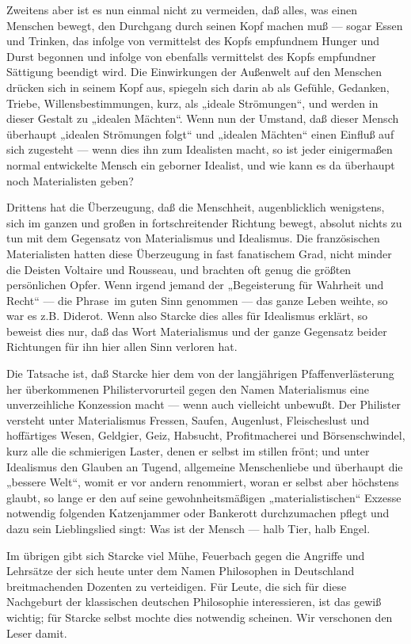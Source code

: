 Zweitens aber ist es nun einmal nicht zu vermeiden, daß alles,
was einen Menschen bewegt, den Durchgang durch seinen Kopf machen muß ---
sogar Essen und Trinken, das infolge von vermittelst des Kopfs
empfundnem  Hunger und Durst begonnen und infolge von ebenfalls
vermittelst des Kopfs empfundner Sättigung beendigt wird. Die
Einwirkungen der Außenwelt auf den Menschen drücken sich in seinem Kopf
aus, spiegeln sich darin ab als Gefühle, Gedanken, Triebe,
Willensbestimmungen, kurz, als „ideale Strömungen``, und werden in dieser
Gestalt zu „idealen Mächten``. Wenn nun der Umstand, daß dieser Mensch
überhaupt „idealen Strömungen folgt`` und „idealen Mächten`` einen
Einfluß auf sich zugesteht --- wenn dies ihn zum Idealisten macht, so ist
jeder einigermaßen normal entwickelte Mensch ein geborner Idealist, und
wie kann es da überhaupt noch Materialisten geben?

Drittens hat die Überzeugung, daß die Menschheit, augenblicklich
wenigstens, sich im ganzen und großen in fortschreitender Richtung
bewegt, absolut nichts zu tun mit dem Gegensatz von Materialismus und
Idealismus. Die französischen Materialisten hatten diese Überzeugung in
fast fanatischem Grad, nicht minder die Deisten Voltaire und Rousseau,
und brachten oft genug die größten persönlichen Opfer. Wenn irgend
jemand der „Begeisterung für Wahrheit und Recht`` --- die Phrase\est\ im guten
Sinn genommen --- das ganze Leben weihte, so war es z.B. Diderot. Wenn
also Starcke dies alles für Idealismus erklärt, so beweist dies nur, daß
das Wort Materialismus und der ganze Gegensatz beider Richtungen für ihn
hier allen Sinn verloren hat.

Die Tatsache ist, daß Starcke hier dem von der langjährigen
Pfaffenverlästerung her überkommenen Philistervorurteil gegen den Namen
Materialismus eine unverzeihliche Konzession macht --- wenn auch
vielleicht unbewußt. Der Philister versteht unter Materialismus Fressen,
Saufen, Augenlust, Fleischeslust und hoffärtiges Wesen, Geldgier, Geiz,
Habsucht, Profitmacherei und Börsenschwindel, kurz alle die schmierigen
Laster, denen er selbst im stillen frönt; und unter Idealismus den
Glauben an Tugend, allgemeine Menschenliebe und überhaupt die „bessere
Welt``, womit er vor andern renommiert, woran er selbst aber höchstens
glaubt, so lange er den auf seine gewohnheitsmäßigen „materialistischen``
Exzesse notwendig folgenden Katzenjammer oder Bankerott durchzumachen
pflegt und dazu sein Lieblingslied singt: Was ist der Mensch --- halb
Tier, halb Engel.

Im übrigen gibt sich Starcke viel Mühe, Feuerbach gegen die
Angriffe und Lehrsätze der sich heute unter dem Namen Philosophen in
Deutschland breitmachenden Dozenten zu verteidigen. Für Leute, die sich
für diese Nachgeburt der klassischen deutschen Philosophie
interessieren, ist das gewiß wichtig; für Starcke selbst mochte dies
notwendig scheinen. Wir verschonen den Leser damit.

